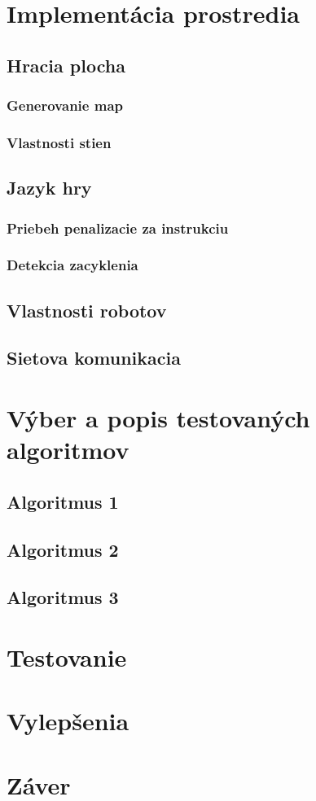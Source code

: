 \documentclass[a4paper,11pt,final]{report}
\begin{document}
\chapter{Implementácia prostredia}
\section{Hracia plocha} %
\subsection{Generovanie map}%
\subsection{Vlastnosti stien} %
\section{Jazyk hry} %
\subsection{Priebeh penalizacie za instrukciu}
\subsection{Detekcia zacyklenia}
\section{Vlastnosti robotov}
\section{Sietova komunikacia}
\chapter{Výber a popis testovaných algoritmov}
\section{Algoritmus 1}
\section{Algoritmus 2}
\section{Algoritmus 3}
\chapter{Testovanie}
\chapter{Vylepšenia}
\chapter{Záver}
\newpage
{}
\begin{thebibliography}{blablablabla}
\end{thebibliography}
\end{document}
